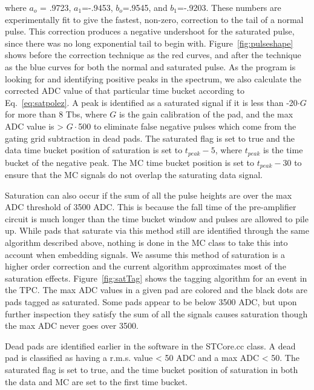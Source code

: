 where $a_o$ = .9723, $a_1$=-.9453, $b_o$=.9545, and $b_1$=-.9203. These numbers are experimentally fit to give the fastest, non-zero, correction to the tail of a normal pulse. This correction produces a negative undershoot for the saturated pulse, since there was no long exponential tail to begin with. Figure~\ref{fig:pulseshape} shows before the correction technique as the red curves, and after the technique as the blue curves for both the normal and saturated pulse. 
As the program is looking for and identifying positive peaks in the spectrum, we also calculate the corrected ADC value of that particular time bucket according to Eq.~\ref{eq:satpolez}. A peak is identified as a saturated signal if it is less than -20$\cdot G$ for more than 8 Tbs, where $G$ is the gain calibration of the pad, and the max ADC value is > $G\cdot$500 to eliminate false negative pulses which come from the gating grid subtraction in dead pads. The saturated flag is set to true and the data time bucket position of saturation is set to $t_{peak} - 5$, where $t_{peak}$ is the time bucket of the negative peak. The MC time bucket position is set to $t_{peak} - 30$ to ensure that the MC signals do not overlap the saturating data signal.

Saturation can also occur if the sum of all the pulse heights are over the max ADC threshold of 3500 ADC. This is because the fall time of the pre-amplifier circuit is much longer than the time bucket window and pulses are allowed to pile up. While pads that saturate via this method still are identified through the same algorithm described above, nothing is done in the MC class to take this into account when embedding signals. We assume this method of saturation is a higher order correction and the current algorithm approximates most of the saturation effects. Figure~\ref{fig:satTag} shows the tagging algorithm for an event in the TPC. The max ADC values in a given pad are colored and the black dots are pads tagged as saturated. Some pads appear to be below 3500 ADC, but upon further inspection they satisfy the sum of all the signals causes saturation though the max ADC never goes over 3500. 

Dead pads are identified earlier in the software in the STCore.cc class. A dead pad is classified as having a r.m.s. value  < 50 ADC and a max ADC < 50. The saturated flag is set to true, and the time bucket position of saturation in both the data and MC are set to the first time bucket. 



